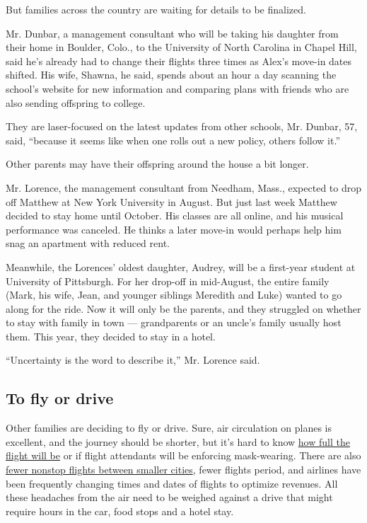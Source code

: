 But families across the country are waiting for details to be finalized.

Mr. Dunbar, a management consultant who will be taking his daughter from
their home in Boulder, Colo., to the University of North Carolina in
Chapel Hill, said he's already had to change their flights three times
as Alex's move-in dates shifted. His wife, Shawna, he said, spends about
an hour a day scanning the school's website for new information and
comparing plans with friends who are also sending offspring to college.

They are laser-focused on the latest updates from other schools, Mr.
Dunbar, 57, said, ``because it seems like when one rolls out a new
policy, others follow it.''

Other parents may have their offspring around the house a bit longer.

Mr. Lorence, the management consultant from Needham, Mass., expected to
drop off Matthew at New York University in August. But just last week
Matthew decided to stay home until October. His classes are all online,
and his musical performance was canceled. He thinks a later move-in
would perhaps help him snag an apartment with reduced rent.

Meanwhile, the Lorences' oldest daughter, Audrey, will be a first-year
student at University of Pittsburgh. For her drop-off in mid-August, the
entire family (Mark, his wife, Jean, and younger siblings Meredith and
Luke) wanted to go along for the ride. Now it will only be the parents,
and they struggled on whether to stay with family in town ---
grandparents or an uncle's family usually host them. This year, they
decided to stay in a hotel.

``Uncertainty is the word to describe it,'' Mr. Lorence said.

\hypertarget{to-fly-or-drive}{%
\subsection{To fly or drive}\label{to-fly-or-drive}}

Other families are deciding to fly or drive. Sure, air circulation on
planes is excellent, and the journey should be shorter, but it's hard to
know
\href{https://www.nytimes3xbfgragh.onion/2020/07/21/travel/crowded-flights-coronavirus.html}{how
full the flight will be} or if flight attendants will be enforcing
mask-wearing. There are also
\href{https://www.nytimes3xbfgragh.onion/2020/04/09/travel/coronavirus-regional-airports-cancellations.html}{fewer
nonstop flights between smaller cities}, fewer flights period, and
airlines have been frequently changing times and dates of flights to
optimize revenues. All these headaches from the air need to be weighed
against a drive that might require hours in the car, food stops and a
hotel stay.

